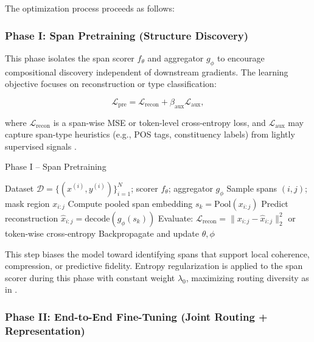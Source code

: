 \vspace{0.75em}
\noindent The optimization process proceeds as follows:

\subsubsection*{Phase I: Span Pretraining (Structure Discovery)}

This phase isolates the span scorer \(f_\theta\) and aggregator \(g_\phi\) to encourage compositional discovery independent of downstream gradients. The learning objective focuses on reconstruction or type classification:

\begin{equation}
\mathcal{L}_{\mathrm{pre}} = \mathcal{L}_{\mathrm{recon}} + \beta_{\mathrm{aux}} \mathcal{L}_{\mathrm{aux}},
\label{eq:pretraining_loss}
\end{equation}

where \(\mathcal{L}_{\mathrm{recon}}\) is a span-wise MSE or token-level cross-entropy loss, and \(\mathcal{L}_{\mathrm{aux}}\) may capture span-type heuristics (e.g., POS tags, constituency labels) from lightly supervised signals \cite{naradowsky2021structured}.

\begin{algorithm}[H]
\caption{Phase I – Span Pretraining}
\label{alg:span_pretraining}
\begin{algorithmic}[1]
\REQUIRE Dataset \(\mathcal{D} = \{(x^{(i)}, y^{(i)})\}_{i=1}^{N}\); scorer \(f_\theta\); aggregator \(g_\phi\)
  \STATE Sample spans \((i,j)\); mask region \(x_{i:j}\)
  \STATE Compute pooled span embedding \(s_k = \mathrm{Pool}(x_{i:j})\)
  \STATE Predict reconstruction \(\hat{x}_{i:j} = \mathrm{decode}(g_\phi(s_k))\)
  \STATE Evaluate: \(\mathcal{L}_{\mathrm{recon}} = \|x_{i:j} - \hat{x}_{i:j}\|_2^2\) or token-wise cross-entropy
  \STATE Backpropagate and update \(\theta, \phi\)
\ENDFOR
\end{algorithmic}
\end{algorithm}

This step biases the model toward identifying spans that support local coherence, compression, or predictive fidelity. Entropy regularization is applied to the span scorer during this phase with constant weight \(\lambda_0\), maximizing routing diversity as in \cite{grandvalet2005semi}.

\vspace{0.75em}
\subsubsection*{Phase II: End-to-End Fine-Tuning (Joint Routing + Representation)}

